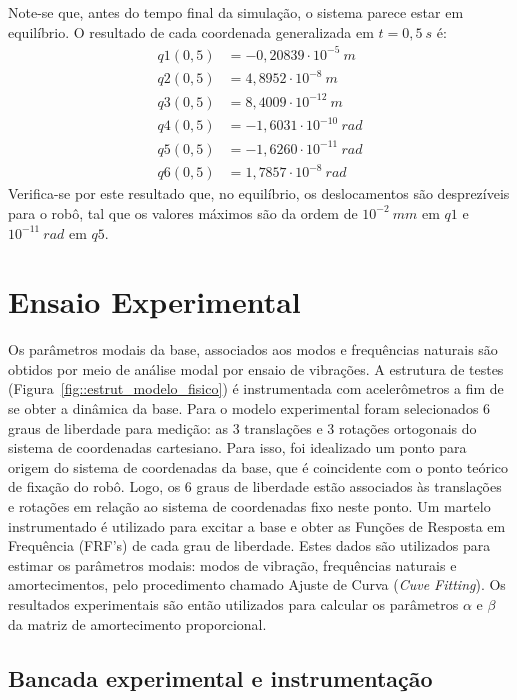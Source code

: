 Note-se que, antes do tempo final da simulação, o sistema parece estar em
equilíbrio. O resultado de cada coordenada generalizada em $t=0,5~s$ é:
%
\begin{align*}
	q1(0,5) &= -0,20839\cdot 10^{-5}~m \\
	q2(0,5) &= 4,8952\cdot 10^{-8}~m \\
	q3(0,5) &= 8,4009 \cdot 10^{-12}~m \\
	q4(0,5) &= -1,6031\cdot 10^{-10}~rad \\
	q5(0,5)	&= -1,6260\cdot 10^{-11}~rad \\
	q6(0,5) &= 1,7857\cdot 10^{-8}~rad
\end{align*}
%
Verifica-se por este resultado que, no equilíbrio, os deslocamentos são
desprezíveis para o robô, tal que os valores máximos são da ordem de
$10^{-2}~mm$ em $q1$ e $10^{-11}~rad$ em $q5$.








\section{Ensaio Experimental} \label{sec::experimento}

Os parâmetros modais da base, associados aos modos e frequências naturais são
obtidos por meio de análise modal por ensaio de vibrações.
A estrutura de testes (Figura~\ref{fig::estrut_modelo_fisico}) é instrumentada
com acelerômetros a fim de se obter a dinâmica da base. Para o modelo
experimental foram selecionados 6 graus de liberdade para medição: as 3
translações e 3 rotações ortogonais do sistema de coordenadas cartesiano. Para
isso, foi idealizado um ponto para origem do sistema de coordenadas da base, que
é coincidente com o ponto teórico de fixação do robô. Logo, os 6 graus de
liberdade estão associados às translações e rotações em relação ao sistema de
coordenadas fixo neste ponto.
Um martelo instrumentado é utilizado para excitar a base e obter as Funções de
Resposta em Frequência (FRF's) de cada grau de liberdade.
Estes dados são utilizados para estimar os parâmetros modais:
modos de vibração, frequências naturais e amortecimentos, pelo procedimento
chamado Ajuste de Curva (\textit{Cuve Fitting}).
Os resultados experimentais são então utilizados para calcular os parâmetros
$\alpha$ e $\beta$ da matriz de amortecimento proporcional.


\subsection{Bancada experimental e instrumentação}

